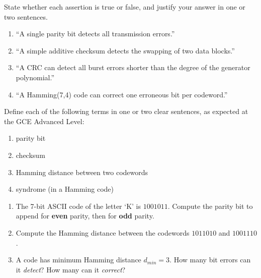 \documentclass[11pt]{article}
\newcommand{\cle}[1]{{\popxbold\color{popdark}#1}}
\newcounter{popsec}
\newcounter{popsub}
\newcommand{\courssub}[1]{%
  \stepcounter{popsub}%
  \par\vspace{9pt}\noindent{\popxbold\fontsize{11.5}{13}\selectfont\color{popink}{\color{poporange}\thepopsec.\thepopsub}\hspace{6pt}#1}\par\nopagebreak\vspace{4pt}
}
\begin{document}
\begin{exercice}
State whether each assertion is true or false, and justify your answer in one or two sentences.
\begin{enumerate}
\item ``A single parity bit detects all transmission errors.''
\item ``A simple additive checksum detects the swapping of two data blocks.''
\item ``A CRC can detect all burst errors shorter than the degree of the generator polynomial.''
\item ``A Hamming(7,4) code can correct one erroneous bit per codeword.''
\end{enumerate}
\end{exercice}

\begin{exercice}[Definitions]
Define each of the following terms in one or two clear sentences, as expected at the GCE Advanced Level:
\begin{enumerate}
\item \cle{parity bit}
\item \cle{checksum}
\item \cle{Hamming distance} between two codewords
\item \cle{syndrome} (in a Hamming code)
\end{enumerate}
\end{exercice}

\begin{exercice}
\begin{enumerate}
\item The 7-bit ASCII code of the letter `K' is $1001011$. Compute the parity bit to append for \textbf{even} parity, then for \textbf{odd} parity.
\item Compute the Hamming distance between the codewords $1011010$ and $1001110$.
\item A code has minimum Hamming distance $d_{min} = 3$. How many bit errors can it \emph{detect}? How many can it \emph{correct}?
\end{enumerate}
\end{exercice}

\courssub{I practise}
\end{document}
